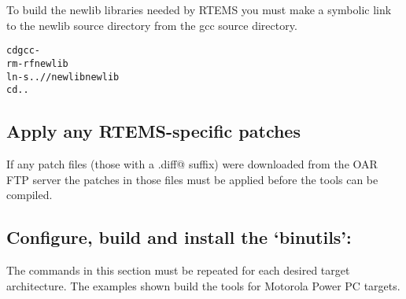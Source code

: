 \documentclass{report}
\begin{document}
To build the newlib libraries needed by RTEMS you must make a symbolic
link to the newlib source directory from the gcc source directory.
\begin{alltt}
cd gcc-\GCC
rm -rf newlib
ln -s ../\NEWLIB/newlib newlib
cd ..
\end{alltt}

\subsection {Apply any RTEMS-specific patches}
If any patch files (those with a \verb@.diff@ suffix) were downloaded
from the OAR FTP server the patches in those files must be applied before
the tools can be compiled.








\subsection {Configure, build and install the `binutils':}
The commands in this section must be repeated for each desired target
architecture.  The examples shown build the tools for Motorola Power PC targets.
\end{document}
